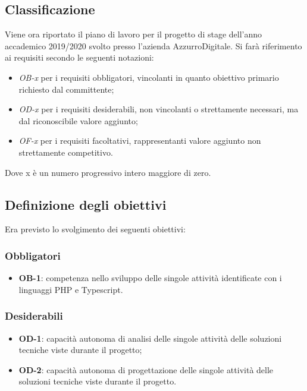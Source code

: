 \subsection{Classificazione}
Viene ora riportato il piano di lavoro per il progetto di stage dell'anno accademico 2019/2020 svolto presso l'azienda AzzurroDigitale.
Si farà riferimento ai requisiti secondo le seguenti notazioni:
\begin{itemize}
	\item \textit{OB-x} per i requisiti obbligatori, vincolanti in quanto obiettivo primario richiesto dal committente;
	\item \textit{OD-x} per i requisiti desiderabili, non vincolanti o strettamente necessari,
	ma dal riconoscibile valore aggiunto;
	\item \textit{OF-x} per i requisiti facoltativi, rappresentanti valore aggiunto non strettamente competitivo.
\end{itemize}
Dove x è un numero progressivo intero maggiore di zero.

\subsection{Definizione degli obiettivi}
\label{cap:obbiettivi}
Era previsto lo svolgimento dei seguenti obiettivi:
\subsubsection*{Obbligatori}
\begin{itemize}
 \item \textbf{OB-1}: competenza nello sviluppo delle singole attività identificate con i linguaggi \gls{PHP} e Typescript.
\end{itemize}
\subsubsection*{Desiderabili} 
\begin{itemize}
 \item \textbf{OD-1}: capacità autonoma di analisi delle singole attività delle soluzioni tecniche viste durante il progetto;
\item \textbf{OD-2}: capacità autonoma di progettazione delle singole attività delle soluzioni tecniche viste durante il progetto.
\end{itemize}

